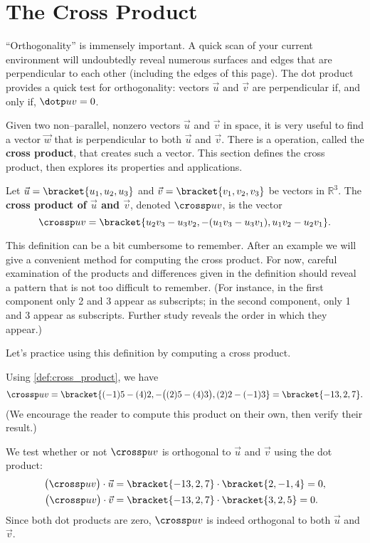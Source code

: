 \section{The Cross Product}\label{sec:cross_product}

``Orthogonality'' is immensely important. A quick scan of your current environment will undoubtedly reveal numerous surfaces and edges that are perpendicular to each other (including the edges of this page). The dot product provides a quick test for orthogonality:  vectors $\vec u$ and $\vec v$ are perpendicular if, and only if, $\dotp uv=0$. 

Given two non--parallel, nonzero vectors $\vec u$ and $\vec v$ in space, it is very useful to find a vector $\vec w$ that is perpendicular to both $\vec u$ and $\vec v$. There is a operation, called the \textbf{cross product}, that creates such a vector. This section defines the cross product, then explores its properties and applications.

{Let $\vec u =\bracket{u_1,u_2,u_3}$ and $\vec v = \bracket{v_1,v_2,v_3}$ be vectors in $\mathbb{R}^3$. The \textbf{cross product of $\vec u$ and $\vec v$}, denoted $\crossp uv$, is the vector
\[\crossp uv = \bracket{u_2v_3-u_3v_2,-(u_1v_3-u_3v_1),u_1v_2-u_2v_1}.\]}

This definition can be a bit cumbersome to remember. After an example we will give a convenient method for computing the cross product. For now, careful examination of the products and differences given in the definition should reveal a pattern that is not too difficult to remember. (For instance, in the first component only 2 and 3 appear as subscripts; in the second component, only 1 and 3 appear as subscripts. Further study reveals the order in which they appear.)


Let's practice using this definition by computing a cross product.

{Using \autoref{def:cross_product}, we have
\[
\crossp uv = \bracket{(-1)5-(4)2,-\big((2)5-(4)3\big), (2)2-(-1)3}=\bracket{-13,2,7}.
\] 
(We encourage the reader to compute this product on their own, then verify their result.)

We test whether or not $\crossp uv$ is orthogonal to $\vec u$ and $\vec v$ using the dot product:
\begin{align*}
\big(\crossp uv\big) \cdot \vec u &=\bracket{-13,2,7}\cdot\bracket{2,-1,4}=0, \\
\big(\crossp uv\big) \cdot \vec v &=\bracket{-13,2,7}\cdot\bracket{3,2,5}=0.
\end{align*}
Since both dot products are zero, $\crossp uv$ is indeed orthogonal to both $\vec u$ and $\vec v$.}

